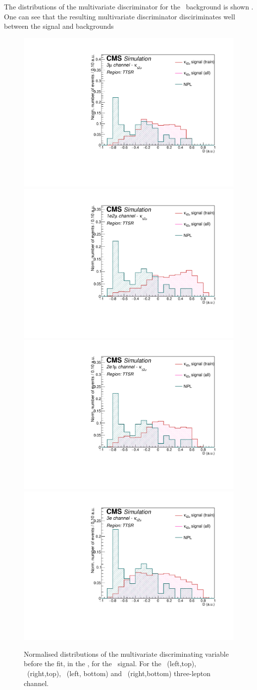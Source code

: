 The distributions of the multivariate discriminator for the \NPL\ background is shown . One can see that the resulting multivariate discriminator disciriminates well between the signal and backgrounds 
\begin{figure}[htbp]
	\centering
	\includegraphics[width=0.49\linewidth]{6_Search/Figures/PlotsTechnicsRead/BDTtechnicsallZuttoppairuuu}
	\includegraphics[width=0.49\linewidth]{6_Search/Figures/PlotsTechnicsRead/BDTtechnicsallZuttoppairuue}
	\includegraphics[width=0.49\linewidth]{6_Search/Figures/PlotsTechnicsRead/BDTtechnicsallZuttoppaireeu}
	\includegraphics[width=0.49\linewidth]{6_Search/Figures/PlotsTechnicsRead/BDTtechnicsallZuttoppaireee}
	\caption{Normalised distributions of the multivariate discriminating variable before the fit, in the \TTSR, for the \Zut\ signal. For the \mumumu\ (left,top), \emumu\ (right,top), \eemu\ (left, bottom) and \eee\ (right,bottom) three-lepton channel.}
	\label{fig:bdtTTSRZut}
\end{figure}	

